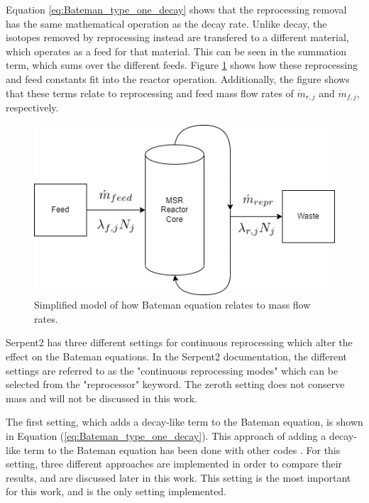 Equation \eqref{eq:Bateman_type_one_decay} shows that the reprocessing removal has the same mathematical operation as the decay rate. Unlike decay, the isotopes removed by reprocessing instead are transfered to a different material, which operates as a feed for that material. This can be seen in the summation term, which sums over the different feeds. Figure \ref{fig:msr-outline-fig-show} shows how these reprocessing and feed constants fit into the reactor operation. Additionally, the figure shows that these terms relate to reprocessing and feed mass flow rates of $\dot{m}_{r, j}$ and $\dot{m}_{f, j}$, respectively.


\begin{figure}[H]
  \centering
  \includegraphics[scale=0.5]{images/msr-feed-repr-fig.png}
  \caption{Simplified model of how Bateman equation relates to mass flow rates.}
   \label{fig:msr-outline-fig-show}
\end{figure}


Serpent2 has three different settings for continuous reprocessing which alter the effect on the Bateman equations. In the Serpent2 documentation, the different settings are referred to as the "continuous reprocessing modes" which can be selected from the "reprocessor" keyword. The zeroth setting does not conserve mass and will not be discussed in this work.

The first setting, which adds a decay-like term to the Bateman equation, is shown in Equation (\ref{eq:Bateman_type_one_decay}). This approach of adding a decay-like term to the Bateman equation has been done with other codes \cite{jr_vicente_valdez_modeling_2020, rodriguez-vieitez_transmutation_2002}. For this setting, three different approaches are implemented in order to compare their results, and are discussed later in this work. This setting is the most important for this work, and is the only setting implemented.


